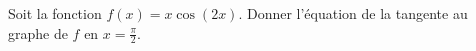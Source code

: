 
\begin{exercice}\label{exoOutilsMath-0039}

    Soit la fonction $f(x)=x\cos(2x)$. Donner l'équation de la tangente au graphe de $f$ en $x=\frac{ \pi }{2}$.

\end{exercice}
